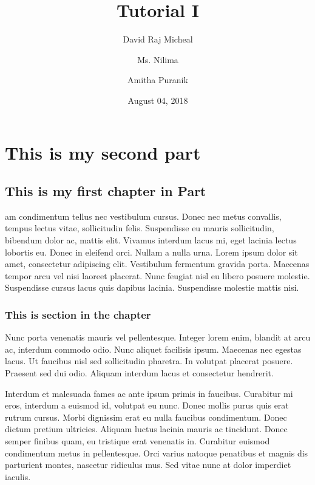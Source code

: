 \documentclass[oneside, a4paper]{book}
\begin{document}
\title{Tutorial I}
\author{David Raj Micheal \and Ms. Nilima \and Amitha Puranik}

\date{August 04, 2018}
\maketitle

\tableofcontents

\part{This is my second part}\label{part:maths}

\chapter{This is my first chapter in Part \ref{part:maths}}

am condimentum tellus nec vestibulum cursus. Donec nec metus convallis, tempus lectus vitae, sollicitudin felis. Suspendisse eu mauris sollicitudin, bibendum dolor ac, mattis elit. Vivamus interdum lacus mi, eget lacinia lectus lobortis eu. Donec in eleifend orci. Nullam a nulla urna. Lorem ipsum dolor sit amet, consectetur adipiscing elit. Vestibulum fermentum gravida porta. Maecenas tempor arcu vel nisi laoreet placerat. Nunc feugiat nisl eu libero posuere molestie. Suspendisse cursus lacus quis dapibus lacinia. Suspendisse molestie mattis nisi.

\section{This is section in the chapter \thechapter}
Nunc porta venenatis mauris vel pellentesque. Integer lorem enim, blandit at arcu ac, interdum commodo odio. Nunc aliquet facilisis ipsum. Maecenas nec egestas lacus. Ut faucibus nisl sed sollicitudin pharetra. In volutpat placerat posuere. Praesent sed dui odio. Aliquam interdum lacus et consectetur hendrerit.

Interdum et malesuada fames ac ante ipsum primis in faucibus. Curabitur mi eros, interdum a euismod id, volutpat eu nunc. Donec mollis purus quis erat rutrum cursus. Morbi dignissim erat eu nulla faucibus condimentum. Donec dictum pretium ultricies. Aliquam luctus lacinia mauris ac tincidunt. Donec semper finibus quam, eu tristique erat venenatis in. Curabitur euismod condimentum metus in pellentesque. Orci varius natoque penatibus et magnis dis parturient montes, nascetur ridiculus mus. Sed vitae nunc at dolor imperdiet iaculis. 
\end{document}

